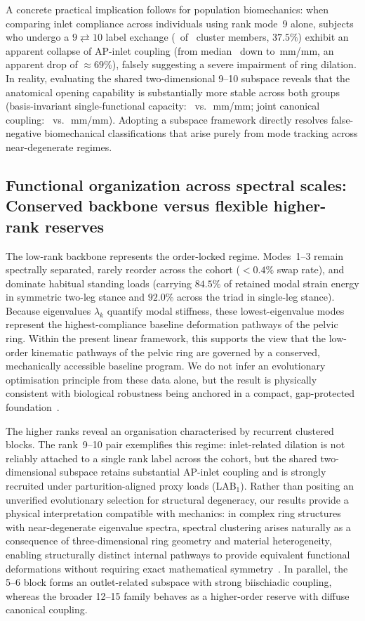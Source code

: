 \documentclass[11pt]{article}
\newcommand{\LABone}{LAB$_1$}
\begin{document}
A concrete practical implication follows for population biomechanics: when comparing inlet compliance across individuals using rank mode~9 alone, subjects who undergo a $9\rightleftarrows 10$ label exchange (\ClusterSwapN\ of \ClusterMemberN\ cluster members, $37.5\%$) exhibit an apparent collapse of AP-inlet coupling (from median \RankNineNo\ down to \RankNineYes\,mm/mm, an apparent drop of $\approx 69\%$), falsely suggesting a severe impairment of ring dilation.
In reality, evaluating the shared two-dimensional 9--10 subspace reveals that the anatomical opening capability is substantially more stable across both groups (basis-invariant single-functional capacity: \ScalarAPNo\ vs.\ \ScalarAPYes\,mm/mm; joint canonical coupling: \PairAPNo\ vs.\ \PairAPYes\,mm/mm).
Adopting a subspace framework directly resolves false-negative biomechanical classifications that arise purely from mode tracking across near-degenerate regimes.

\subsection*{Functional organization across spectral scales: Conserved backbone versus flexible higher-rank reserves}

The low-rank backbone represents the order-locked regime.
Modes~1--3 remain spectrally separated, rarely reorder across the cohort ($<0.4\%$ swap rate), and dominate habitual standing loads (carrying $84.5\%$ of retained modal strain energy in symmetric two-leg stance and $92.0\%$ across the triad in single-leg stance).
Because eigenvalues $\lambda_k$ quantify modal stiffness, these lowest-eigenvalue modes represent the highest-compliance baseline deformation pathways of the pelvic ring.
Within the present linear framework, this supports the view that the low-order kinematic pathways of the pelvic ring are governed by a conserved, mechanically accessible baseline program.
We do not infer an evolutionary optimisation principle from these data alone, but the result is physically consistent with biological robustness being anchored in a compact, gap-protected foundation~\citep{Kitano2007,Whitacre2010}.

The higher ranks reveal an organisation characterised by recurrent clustered blocks.
The rank~9--10 pair exemplifies this regime: inlet-related dilation is not reliably attached to a single rank label across the cohort, but the shared two-dimensional subspace retains substantial AP-inlet coupling and is strongly recruited under parturition-aligned proxy loads (\LABone).
Rather than positing an unverified evolutionary selection for structural degeneracy, our results provide a physical interpretation compatible with mechanics: in complex ring structures with near-degenerate eigenvalue spectra, spectral clustering arises naturally as a consequence of three-dimensional ring geometry and material heterogeneity, enabling structurally distinct internal pathways to provide equivalent functional deformations without requiring exact mathematical symmetry~\citep{Whitacre2010,Whitacre2012,EdelmanGally2001}.
In parallel, the 5--6 block forms an outlet-related subspace with strong biischiadic coupling, whereas the broader 12--15 family behaves as a higher-order reserve with diffuse canonical coupling.
\end{document}
